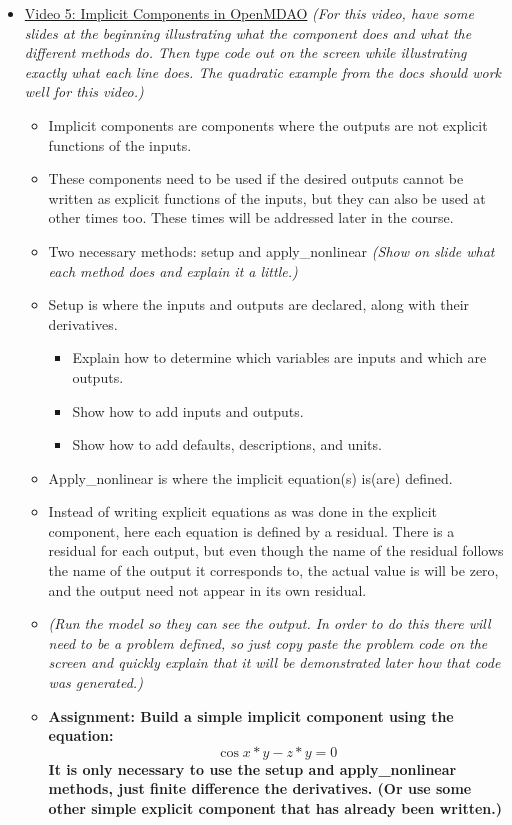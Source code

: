 \documentclass[12pt, letterpaper]{article}
\begin{document}
\begin{itemize}
	\item \underline{Video 5: Implicit Components in OpenMDAO} \textit{(For this video, have some slides at the beginning illustrating what the 				component does and what the different methods do. Then type code out on the screen while illustrating exactly what each line does. The 					quadratic example from the docs should work well for this video.)}
		\begin{itemize}
			\item Implicit components are components where the outputs are not explicit functions of the inputs.
			\item These components need to be used if the desired outputs cannot be written as explicit functions of the inputs, but they can also be 					used at other times too. These times will be addressed later in the course.
			\item Two necessary methods: setup and apply\_nonlinear \textit{(Show on slide what each method does and explain it a little.)}
			\item Setup is where the inputs and outputs are declared, along with their derivatives.
				\begin{itemize}
					\item Explain how to determine which variables are inputs and which are outputs.
					\item Show how to add inputs and outputs.
					\item Show how to add defaults, descriptions, and units.
				\end{itemize}
			\item Apply\_nonlinear is where the implicit equation(s) is(are) defined. 
			\item Instead of writing explicit equations as was done in the explicit component, here each equation is defined by a residual. There is a 					residual for each output, but even though the name of the residual follows the name of the output it corresponds to, the actual value is will be zero, and the output need not appear in its own residual.
			\item \textit{(Run the model so they can see the output. In order to do this there will need to be a problem defined, so just copy paste the 				problem code on the screen and quickly explain that it will be demonstrated later how that code was generated.)}
			\item \textbf{Assignment: Build a simple implicit component using the equation: $$ \cos{x*y}-z*y=0 $$ It is only necessary to use the setup 			and apply\_nonlinear methods, just finite difference the derivatives. (Or use some other simple explicit component that has already been 					written.)}
		\end{itemize}
		

\end{itemize}
\end{document}
